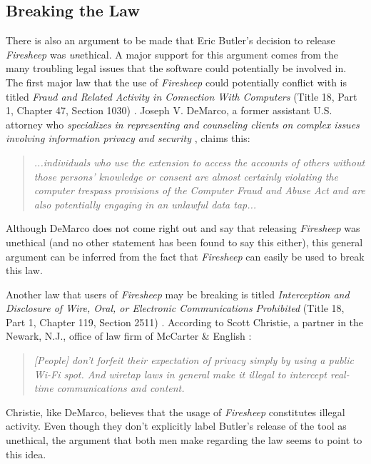 \documentclass[11pt]{article}
\begin{document}
\begin{multicols}{2}
\subsection{Breaking the Law}
There is also an argument to be made that Eric Butler's decision to release \emph{Firesheep} was \emph{un}ethical. A major support for this argument comes from the many troubling legal issues that the software could potentially be involved in. The first major law that the use of \emph{Firesheep} could potentially conflict with is titled \emph{Fraud and Related Activity in Connection With Computers} (Title 18, Part 1, Chapter 47, Section 1030) \cite{law_1}. Joseph V. DeMarco, a former assistant U.S. attorney who \emph{specializes in representing and counseling clients on complex issues involving information privacy and security} \cite{legal_forbes} \cite{demarco}, claims this:

\begin{quote}
  \emph{...individuals who use the extension to access the accounts of others without those persons’ knowledge or consent are almost certainly violating the computer trespass provisions of the Computer Fraud and Abuse Act and are also potentially engaging in an unlawful data tap...} \cite{legal_forbes}
\end{quote}

Although DeMarco does not come right out and say that releasing \emph{Firesheep} was unethical (and no other statement has been found to say this either), this general argument can be inferred from the fact that \emph{Firesheep} can easily be used to break this law.

Another law that users of \emph{Firesheep} may be breaking is titled \emph{Interception and Disclosure of Wire, Oral, or Electronic Communications Prohibited} (Title 18, Part 1, Chapter 119, Section 2511) \cite{law_2}. According to Scott Christie, a partner in the Newark, N.J., office of law firm of McCarter \& English \cite{legal_cw}:

\begin{quote}
  \emph{[People] don't forfeit their expectation of privacy simply by using a public Wi-Fi spot. And wiretap laws in general make it illegal to intercept real-time communications and content.} \cite{legal_cw}
\end{quote}

Christie, like DeMarco, believes that the usage of \emph{Firesheep} constitutes illegal activity. Even though they don't explicitly label Butler's release of the tool as unethical, the argument that both men make regarding the law seems to point to this idea.


\end{multicols}
\end{document}
